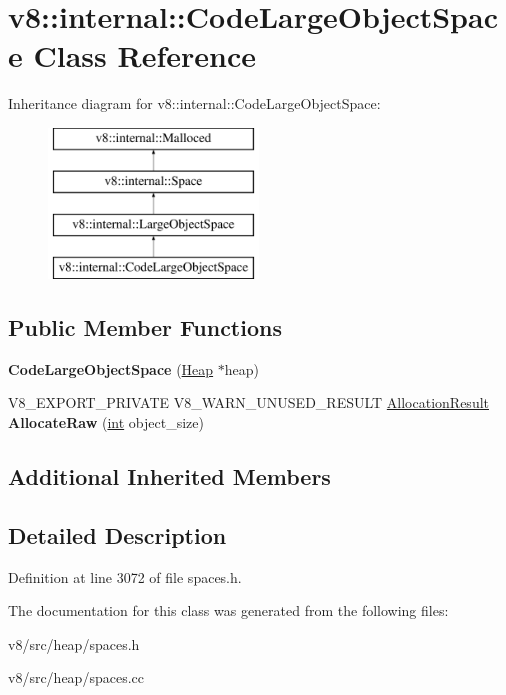 \hypertarget{classv8_1_1internal_1_1CodeLargeObjectSpace}{}\section{v8\+:\+:internal\+:\+:Code\+Large\+Object\+Space Class Reference}
\label{classv8_1_1internal_1_1CodeLargeObjectSpace}
Inheritance diagram for v8\+:\+:internal\+:\+:Code\+Large\+Object\+Space\+:\begin{figure}[H]
\begin{center}
\leavevmode
\includegraphics[height=4.000000cm]{classv8_1_1internal_1_1CodeLargeObjectSpace}
\end{center}
\end{figure}
\subsection*{Public Member Functions}
\begin{DoxyCompactItemize}
\item 
\mbox{\label{classv8_1_1internal_1_1CodeLargeObjectSpace_a3d97c5ca1c35c4288d18423f03a4cb6e}} 
{\bfseries Code\+Large\+Object\+Space} (\mbox{\hyperlink{classv8_1_1internal_1_1Heap}{Heap}} $\ast$heap)
\item 
\mbox{\label{classv8_1_1internal_1_1CodeLargeObjectSpace_a6a86d8a1cd51c6aa7702b9e5057c39af}} 
V8\+\_\+\+E\+X\+P\+O\+R\+T\+\_\+\+P\+R\+I\+V\+A\+TE V8\+\_\+\+W\+A\+R\+N\+\_\+\+U\+N\+U\+S\+E\+D\+\_\+\+R\+E\+S\+U\+LT \mbox{\hyperlink{classv8_1_1internal_1_1AllocationResult}{Allocation\+Result}} {\bfseries Allocate\+Raw} (\mbox{\hyperlink{classint}{int}} object\+\_\+size)
\end{DoxyCompactItemize}
\subsection*{Additional Inherited Members}


\subsection{Detailed Description}


Definition at line 3072 of file spaces.\+h.



The documentation for this class was generated from the following files\+:\begin{DoxyCompactItemize}
\item 
v8/src/heap/spaces.\+h\item 
v8/src/heap/spaces.\+cc\end{DoxyCompactItemize}
